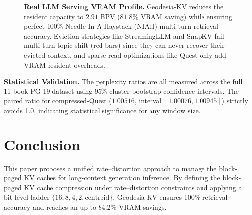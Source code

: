 \documentclass[10pt,twocolumn]{article}
\newcommand{\method}{Geodesia-KV}
\newcommand{\pg}{PG-19}
\begin{document}
\begin{figure}[t]
\centering
{}
\caption{\textbf{Real LLM Serving VRAM Profile.} \method{} reduces the resident capacity to $2.91$ BPV ($81.8\%$ VRAM saving) while ensuring perfect 100\% Needle-In-A-Haystack (NIAH) multi-turn retrieval accuracy. Eviction strategies like StreamingLLM and SnapKV fail multi-turn topic shift (red bars) since they can never recover their evicted context, and sparse-read optimizations like Quest only add VRAM resident overheads.}
\label{fig:serving_benchmark}
\end{figure}

\textbf{Statistical Validation.}
The perplexity ratios are all measured across the full 11-book \pg{} dataset using 95\% cluster bootstrap confidence intervals. The paired ratio for compressed-Quest ($1.00516$, interval $[1.00076, 1.00945]$) strictly avoids 1.0, indicating statistical significance for any window size.

\section{Conclusion}

This paper proposes a unified rate--distortion approach to manage the block-paged KV caches for long-context generation inference. By defining the block-paged KV cache compression under rate--distortion constraints and applying a bit-level ladder $\{16, 8, 4, 2, \text{centroid}\}$, \method{} ensures 100\% retrieval accuracy and reaches an up to 84.2\% VRAM savings.
\end{document}
